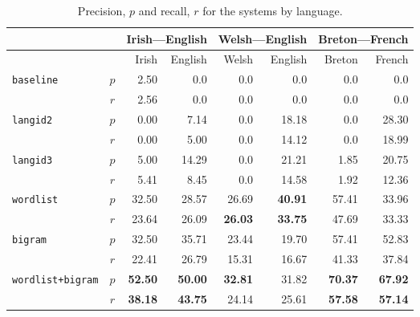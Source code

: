 \documentclass[11pt]{article}
\begin{document}
\begin{table}
\begin{center}
\begin{tabular}{|lc|rr|rr|rr|}
\hline
            & & \multicolumn{2}{c}{Irish---English} & \multicolumn{2}{c}{Welsh---English} & \multicolumn{2}{c}{Breton---French}  \\
\hline
                                          &      &  Irish &  English & Welsh  & English & Breton & French \\ 
\multirow{2}{*}{\texttt{baseline}}        &  $p$ &  2.50   & 0.0      & 0.0   & 0.0 & 0.0 & 0.0 \\
                                          & $r$  & 2.56    & 0.0      & 0.0   & 0.0 & 0.0 & 0.0 \\
\hline
\multirow{2}{*}{\texttt{langid2}}         &  $p$ &  0.00   & 7.14     & 0.0   & 18.18    & 0.0 & 28.30 \\
                                          & $r$  & 0.00    & 5.00     & 0.0   & 14.12 & 0.0 & 18.99 \\
\hline
\multirow{2}{*}{\texttt{langid3}}         &  $p$ &  5.00   & 14.29    & 0.0   & 21.21 & 1.85 & 20.75 \\
                                          & $r$  & 5.41    & 8.45     & 0.0   & 14.58 & 1.92 & 12.36 \\
\hline
\multirow{2}{*}{\texttt{wordlist}}        &  $p$ &  32.50 & 28.57     & 26.69 & {\bf 40.91} & 57.41 & 33.96 \\
                                          & $r$  & 23.64  & 26.09     & {\bf 26.03} & {\bf 33.75} & 47.69 & 33.33 \\
\hline
\multirow{2}{*}{\texttt{bigram}}          &  $p$ &  32.50   & 35.71   & 23.44 & 19.70  & 57.41 & 52.83 \\
                                          & $r$  & 22.41    & 26.79   & 15.31 & 16.67 & 41.33 & 37.84 \\
\hline
\multirow{2}{*}{\texttt{wordlist+bigram}} &  $p$ &  {\bf 52.50}   & {\bf 50.00}   & {\bf 32.81} & 31.82 & {\bf 70.37} & {\bf 67.92} \\
                                          & $r$  & {\bf 38.18}    & {\bf 43.75}   & 24.14 & 25.61 & {\bf 57.58} & {\bf 57.14} \\
\hline
\end{tabular}
\end{center}
\label{table:precisionrecall}
\caption{Precision, $p$ and recall, $r$ for the systems by language.}

\end{table}
\end{document}

